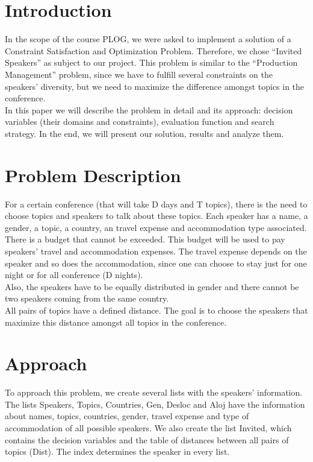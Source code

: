 \documentclass[runningheads,a4paper]{llncs}
\begin{document}
\section{Introduction}

In the scope of the course PLOG, we were asked to implement a solution of a Constraint Satisfaction and Optimization Problem. Therefore, we chose “Invited Speakers” as subject to our project. This problem is similar to the “Production Management” problem, since we have to fulfill several constraints on the speakers’ diversity, but we need to maximize the difference amongst topics in the conference.\\
In this paper we will describe the problem in detail and its approach: decision variables (their domains and constraints), evaluation function and search strategy. In the end, we will present our solution, results and analyze them.


\section{Problem Description}

For a certain conference (that will take D days and T topics), there is the need to choose topics and speakers to talk about these topics. Each speaker has a name, a gender, a topic, a country, an travel expense and accommodation type associated.\\
There is a budget that cannot be exceeded. This budget will be used to pay speakers’ travel and accommodation expenses. The travel expense depends on the speaker and so does the accommodation, since one can choose to stay just for one night or for all conference (D nights).\\
Also, the speakers have to be equally distributed in gender and there cannot be two speakers coming from the same country. \\
All pairs of topics have a defined distance. The goal is to choose the speakers that maximize this distance amongst all topics in the conference.

\section{Approach}

To approach this problem, we create several lists with the speakers’ information. The lists Speakers, Topics, Countries, Gen, Desloc and Aloj have the information about names, topics, countries, gender, travel expense and type of accommodation of all possible speakers. We also create the list Invited, which contains the decision variables and the table of distances between all pairs of topics (Dist). The index determines the speaker in every list.
\end{document}
